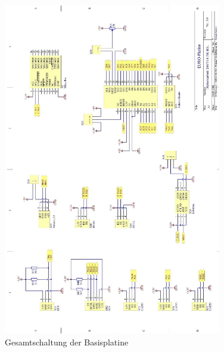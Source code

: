 \begin{figure}[H]\ContinuedFloat
    \centering
    \includegraphics[width=0.85\textwidth]{Schuh/Pictures/Basis-Schaltung5}
    \caption[Gesamtschaltung der Basisplatine]{Gesamtschaltung der \gls{Basisplatine}}
\end{figure}
